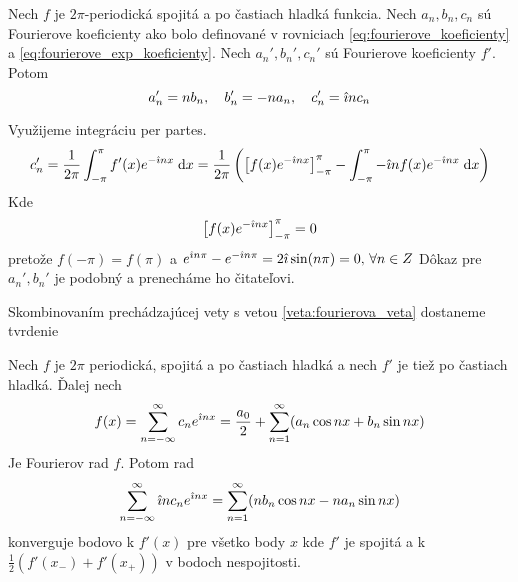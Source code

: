 \begin{veta}
    Nech $f$ je $2\pi$-periodická spojitá a po častiach hladká funkcia.
    Nech $a_n,b_n,c_n$ sú Fourierove koeficienty ako bolo definované
    v rovniciach \eqref{eq:fourierove_koeficienty} a
        \eqref{eq:fourierove_exp_koeficienty}.
    Nech $a_n',b_n',c_n'$ sú Fourierove koeficienty $f'$. Potom 
    \begin{equation}
        a_n' = n b_n, \quad b_n' = -n a_n, \quad c_n' = \hat{\imath} n c_n
        \label{eq:derivacia_koeficienty}
    \end{equation}
    \label{veta:derivacia_koeficienty}
\end{veta}
\begin{dokaz}
    Využijeme integráciu per partes.
    \begin{equation*}
      c_n' = \frac{1}{2\pi} \int_{-\pi}^{\pi} f'(x) e^{-\hat{\imath} n x} \; \mathrm{d} x =
        \frac{1}{2\pi} \left(
          \left[ f(x) e^{-\hat{\imath} n x}\right]_{-\pi}^{\pi} -
          \int_{-\pi}^{\pi} -\hat{\imath} n f(x) e^{-\hat{\imath} n x} \; \mathrm{d} x
          \right)
    \end{equation*}
    Kde
    \begin{equation*}
          \left[ f(x) e^{-\hat{\imath} n x}\right]_{-\pi}^{\pi} = 0
    \end{equation*}
    pretože $f(-\pi)=f(\pi)$ a $e^{\hat{\imath} n \pi} - e^{-\hat{\imath} n \pi} =
    2\hat{\imath} \sin(n \pi) = 0, \,
    \forall n\in Z$
    Dôkaz pre $a_n',b_n'$ je podobný a prenecháme ho čitateľovi.
\end{dokaz}

Skombinovaním prechádzajúcej vety s vetou \ref{veta:fourierova_veta}
dostaneme tvrdenie
\begin{veta}
    Nech $f$ je $2\pi$ periodická, spojitá a po častiach hladká a nech
    $f'$ je tiež po častiach hladká. Ďalej nech    
    \begin{equation*}
        f(x) = \sum_{n=-\infty}^{\infty} c_n e^{\hat{\imath} n x} = 
         \frac{a_0}{2} + \sum_{n=1}^{\infty} (
            a_n \cos n x + b_n \sin n x)        
    \end{equation*}
    Je Fourierov rad $f$.
    Potom rad
    \begin{equation*}
        \sum_{n=-\infty}^{\infty} \hat{\imath} n c_n e^{\hat{\imath} n x} = 
         \sum_{n=1}^{\infty} (
            n b_n \cos n x - n a_n \sin n x)        
    \end{equation*}
    konverguje bodovo k $f'(x)$ pre všetko body $x$ kde $f'$ je
    spojitá a k $\frac{1}{2}(f'(x_-) + f'(x_+) )$ v bodoch
    nespojitosti.
    \label{veta:fourier_derivacia}
\end{veta}

